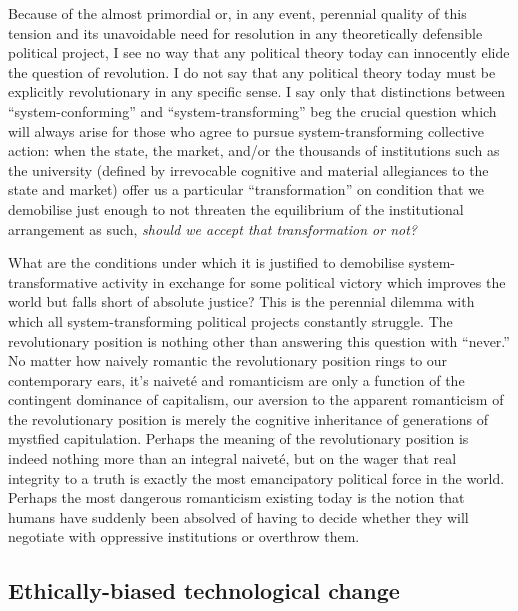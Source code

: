\documentclass[a4paper,12pt,margin=.5in]{article}
\begin{document}
Because of the almost primordial or, in any event, perennial quality of
this tension and its unavoidable need for resolution in any
theoretically defensible political project, I see no way that any
political theory today can innocently elide the question of revolution.
I do not say that any political theory today must be explicitly
revolutionary in any specific sense. I say only that distinctions
between ``system-conforming'' and ``system-transforming'' beg the
crucial question which will always arise for those who agree to pursue
system-transforming collective action: when the state, the market,
and/or the thousands of institutions such as the university (defined by
irrevocable cognitive and material allegiances to the state and market)
offer us a particular ``transformation'' on condition that we demobilise
just enough to not threaten the equilibrium of the institutional
arrangement as such, \emph{should we accept that transformation or not?}

What are the conditions under which it is justified to demobilise
system-transformative activity in exchange for some political victory
which improves the world but falls short of absolute justice? This is
the perennial dilemma with which all system-transforming political
projects constantly struggle. The revolutionary position is nothing
other than answering this question with ``never.'' No matter how naively
romantic the revolutionary position rings to our contemporary ears, it's
naiveté and romanticism are only a function of the contingent dominance
of capitalism, our aversion to the apparent romanticism of the
revolutionary position is merely the cognitive inheritance of
generations of mystfied capitulation. Perhaps the meaning of the
revolutionary position is indeed nothing more than an integral naiveté,
but on the wager that real integrity to a truth is exactly the most
emancipatory political force in the world. Perhaps the most dangerous
romanticism existing today is the notion that humans have suddenly been
absolved of having to decide whether they will negotiate with oppressive
institutions or overthrow them.

\subsection{Ethically-biased technological
change}\label{ethically-biased-technological-change}
\end{document}
